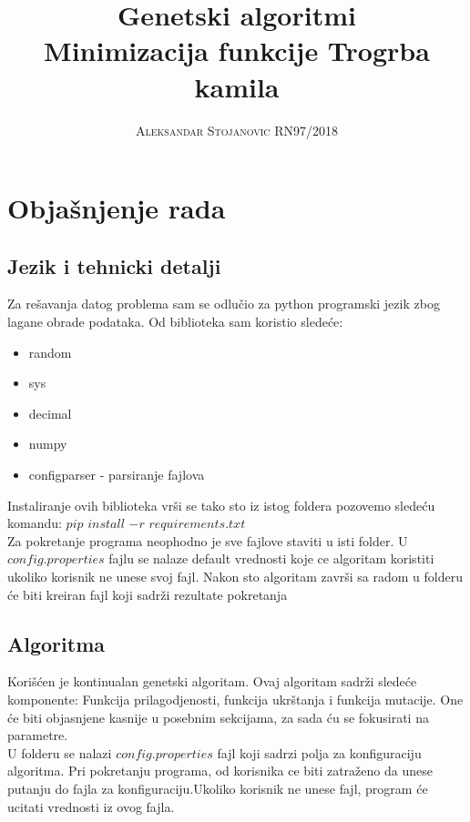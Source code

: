 \documentclass[a4paper,11pt]{book}
\title{\Huge \textbf{Genetski algoritmi} \\ \huge Minimizacija funkcije Trogrba kamila}
\author{\textsc{Aleksandar Stojanovic RN97/2018}}
\begin{document}
\frontmatter
\maketitle

\mainmatter

\chapter{Objašnjenje rada}

\section{Jezik i tehnicki detalji}
Za rešavanja datog problema sam se odlučio za python programski jezik zbog lagane obrade podataka. Od biblioteka sam koristio sledeće:

\begin{itemize}
  \item random
  \item sys
  \item decimal
  \item numpy 
  \item configparser - parsiranje fajlova
\end{itemize}

Instaliranje ovih biblioteka vrši se tako sto iz istog foldera pozovemo sledeću komandu: $pip$ $install$ $-r$ $requirements.txt$ \\
Za pokretanje programa neophodno je sve fajlove staviti u isti folder. U $config.properties$ fajlu se nalaze default vrednosti koje ce algoritam koristiti ukoliko korisnik ne unese svoj fajl. Nakon sto algoritam završi sa radom u folderu će biti kreiran fajl koji sadrži rezultate pokretanja

\section{Algoritma}

Korišćen je kontinualan genetski algoritam. Ovaj algoritam sadrži sledeće komponente: Funkcija prilagodjenosti, funkcija ukrštanja i funkcija mutacije. One će biti objasnjene kasnije u posebnim sekcijama, za sada ću se fokusirati na parametre.\\

U folderu se nalazi $config.properties$ fajl koji sadrzi polja za konfiguraciju algoritma. Pri pokretanju programa, od korisnika ce biti zatraženo da unese putanju do fajla za konfiguraciju.Ukoliko korisnik ne unese fajl, program će ucitati vrednosti iz ovog fajla. \\
\end{document}
